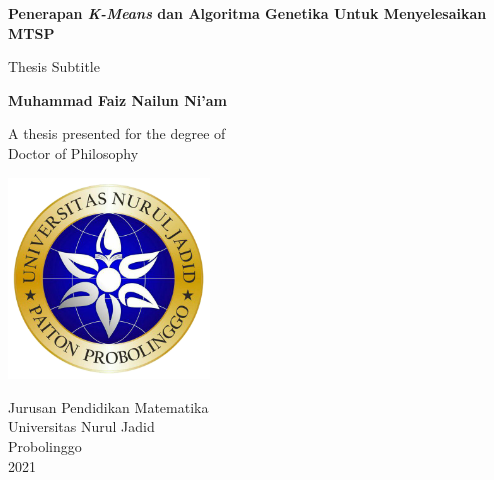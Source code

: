\begin{titlepage}
   \begin{center}
       \vspace*{1cm}

       \textbf{Penerapan \textit{K-Means} dan Algoritma Genetika Untuk Menyelesaikan MTSP}

       \vspace{0.5cm}
        Thesis Subtitle
            
       \vspace{1.5cm}

       \textbf{Muhammad Faiz Nailun Ni'am}

       \vfill
            
       A thesis presented for the degree of\\
       Doctor of Philosophy
            
       \vspace{0.8cm}
     
       \includegraphics[width=0.4\textwidth]{logo.png} 
            
       Jurusan Pendidikan Matematika\\
       Universitas Nurul Jadid\\
       Probolinggo\\
       2021
            
   \end{center}
\end{titlepage}